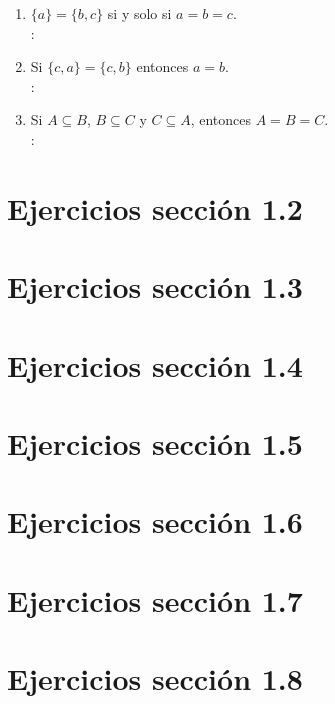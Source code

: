 \begin{enumerate}[label=1.1.\arabic*.]
\begin{enumerate}[label=(\alph*)]
		\item $ \{ a \} = \{ b, c \} $ si y solo si $ a = b = c $. \\
		\solucion: \\
		
		\item Si $ \{ c, a \} = \{ c, b \} $ entonces $ a = b $. \\
		\solucion: \\
		
		\item Si $ A \subseteq B $, $ B \subseteq C $ y $ C \subseteq A $, entonces $ A = B = C $. \\
		\solucion: \\
		
	\end{enumerate}
	
\end{enumerate}

\section{Ejercicios sección 1.2}

\section{Ejercicios sección 1.3}

\section{Ejercicios sección 1.4}

\section{Ejercicios sección 1.5}

\section{Ejercicios sección 1.6}

\section{Ejercicios sección 1.7}

\section{Ejercicios sección 1.8}
